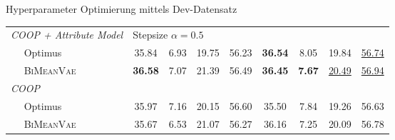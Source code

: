 \begin{frame}{Hyperparameter Optimierung mittels Dev-Datensatz}
\begin{table}[!h]
{\begin{tabular}{@{}lcccc|cccc@{}}
    \textit{COOP + Attribute Model}        &    \multicolumn{3}{l}{Stepsize $\alpha= 0.5$}            &        &   & &     \\
    $\quad$ Optimus            & 35.84  &6.93 & 19.75& 56.23&   \textbf{36.54}  &   8.05   &19.84   & \underline{56.74}  \\ 
    $\quad$ \textsc{BiMeanVae}& \textbf{36.58} & 7.07 & 21.39 & 56.49 & \textbf{36.45} & \textbf{7.67} & \underline{20.49}& \underline{56.94} \\ \midrule %

    \textit{COOP}              &         &         &        &        &        & &   &    \\
    $\quad$ Optimus        & 35.97 & 7.16 & 20.15 & 56.60 & 35.50  & 7.84  & 19.26 & 56.63\\  %
    $\quad$ \textsc{BiMeanVae} &  35.67 &6.53 & 21.07 & 56.27 & 36.16 & 7.25 & 20.09 & 56.78\\ 
    	\bottomrule
    
    \end{tabular}}
    
\end{table}
  
\end{frame}


